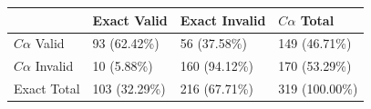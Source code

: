 \begin{tabular}{llll}
\toprule
 & Exact Valid & Exact Invalid & $C\alpha$ Total \\
\midrule
$C\alpha$ Valid & 93 (62.42\%) & 56 (37.58\%) & 149 (46.71\%) \\
$C\alpha$ Invalid & 10 (5.88\%) & 160 (94.12\%) & 170 (53.29\%) \\
Exact Total & 103 (32.29\%) & 216 (67.71\%) & 319 (100.00\%) \\
\bottomrule
\end{tabular}
